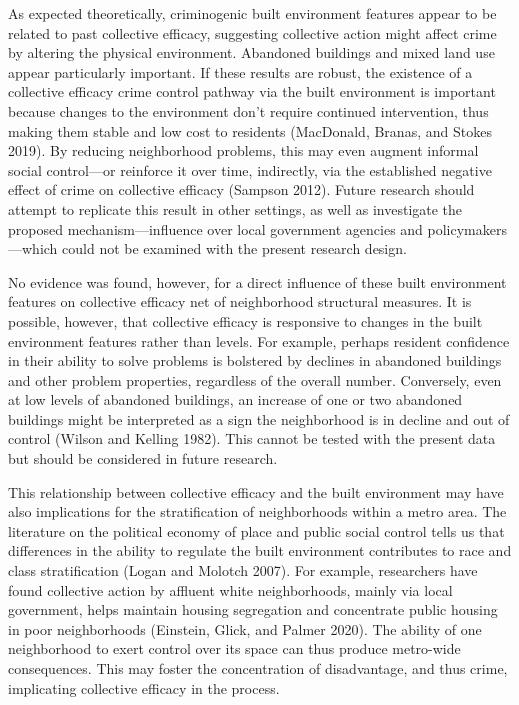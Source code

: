 \documentclass [11pt, proquest] {uwthesis}[2015/03/03]
\begin{document}
As expected theoretically, criminogenic built environment features appear to be related to past collective efficacy, suggesting collective action might affect crime by altering the physical environment. Abandoned buildings and mixed land use appear particularly important. If these results are robust, the existence of a collective efficacy crime control pathway via the built environment is important because changes to the environment don't require continued intervention, thus making them stable and low cost to residents (MacDonald, Branas, and Stokes 2019). By reducing neighborhood problems, this may even augment informal social control---or reinforce it over time, indirectly, via the established negative effect of crime on collective efficacy (Sampson 2012). Future research should attempt to replicate this result in other settings, as well as investigate the proposed mechanism---influence over local government agencies and policymakers---which could not be examined with the present research design.

No evidence was found, however, for a direct influence of these built environment features on collective efficacy net of neighborhood structural measures. It is possible, however, that collective efficacy is responsive to changes in the built environment features rather than levels. For example, perhaps resident confidence in their ability to solve problems is bolstered by declines in abandoned buildings and other problem properties, regardless of the overall number. Conversely, even at low levels of abandoned buildings, an increase of one or two abandoned buildings might be interpreted as a sign the neighborhood is in decline and out of control (Wilson and Kelling 1982). This cannot be tested with the present data but should be considered in future research.

This relationship between collective efficacy and the built environment may have also implications for the stratification of neighborhoods within a metro area. The literature on the political economy of place and public social control tells us that differences in the ability to regulate the built environment contributes to race and class stratification (Logan and Molotch 2007). For example, researchers have found collective action by affluent white neighborhoods, mainly via local government, helps maintain housing segregation and concentrate public housing in poor neighborhoods (Einstein, Glick, and Palmer 2020). The ability of one neighborhood to exert control over its space can thus produce metro-wide consequences. This may foster the concentration of disadvantage, and thus crime, implicating collective efficacy in the process.
\end{document}
